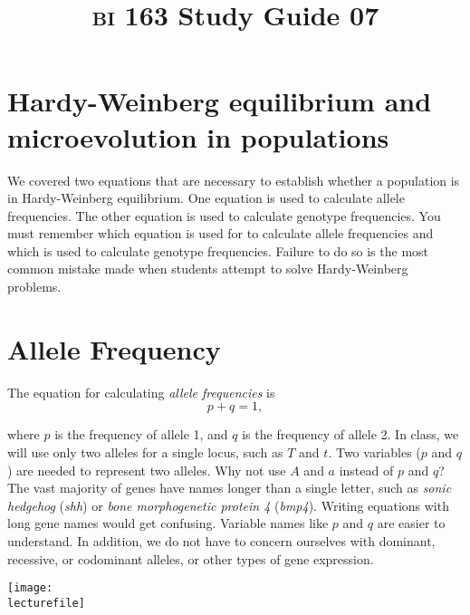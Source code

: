 \documentclass[letterpaper]{tufte-handout}
\title{{\scshape bi} 163 Study Guide 07}
\date{} %
\newcommand\lecturefile{163_lecture07_fullsize}
\begin{document}
\maketitle	%

\section{Hardy-Weinberg equilibrium and microevolution in populations}
We covered two equations that are necessary to establish whether a population is in Hardy-Weinberg equilibrium. One equation is used to calculate allele frequencies. The other equation is used to calculate genotype frequencies. You must remember which equation is used for to calculate allele frequencies and which is used to calculate genotype frequencies. Failure to do so is the most common mistake made when students attempt to solve Hardy-Weinberg problems.

\section{Allele Frequency}

The equation for calculating \emph{allele frequencies} is 
\begin{equation*}
	p+q = 1,
\end{equation*}

where $p$ is the frequency of allele 1, and $q$ is the frequency of allele 2. In class, we will use only two alleles for a single locus, such as $T$ and $t$.  Two variables ($p$ and $q$) are needed to represent two alleles.  Why not use $A$ and $a$ instead of $p$ and $q$?  The vast majority of genes have names longer than a single letter, such as \emph{sonic hedgehog} (\emph{shh}) or \emph{bone morphogenetic protein 4} (\emph{bmp4}). Writing equations with long gene names would get confusing. Variable names like $p$ and $q$ are easier to understand.  In addition, we do not have to concern ourselves with dominant, recessive, or codominant alleles, or other types of gene expression. 

\begin{marginfigure}[0.5in]
	\texttt{[image: \\lecturefile]}
\end{marginfigure}
\end{document}
